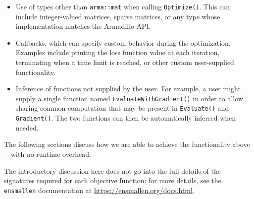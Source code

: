 \begin{itemize}

\item
Use of types other than {\tt arma::mat} when calling {\tt Optimize()}.
This can include integer-valued matrices, sparse matrices, or any
type whose implementation matches the Armadillo API.

\item
Callbacks, which can specify custom behavior during the optimization.
Examples include printing the loss function value at each iteration,
terminating when a time limit is reached,
or other custom user-supplied functionality.

\item
Inference of functions not supplied by the user.
For example, a user might supply a single function named
{\tt EvaluateWithGradient()}
in order to allow sharing common computation that may be 
present in {\tt Evaluate()} and {\tt Gradient()}.
The two functions can then be automatically inferred when needed.

\end{itemize}

The following sections discuss how we are able to achieve the
functionality above---with no runtime overhead.

The introductory discussion here does not go into the full details of the
signatures required for each objective function; for more details, see the
{\tt ensmallen} documentation at \url{https://ensmallen.org/docs.html}.

